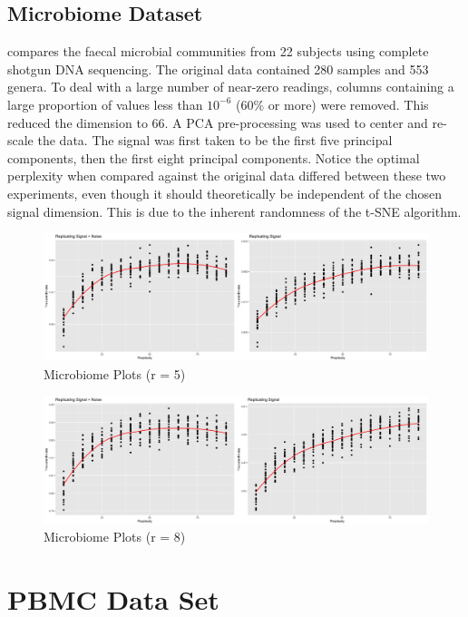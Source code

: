 \documentclass{article}
\begin{document}
\subsection{Microbiome Dataset}
\cite{enterotype data} compares the faecal microbial communities from 22 subjects using complete shotgun DNA sequencing. The original data contained 280 samples and 553 genera. To deal with a large number of near-zero readings, columns containing a large proportion of values less than $10^{-6}$ (60\% or more) were removed. This reduced the dimension to 66. A PCA pre-processing was used to center and re-scale the data. The signal was first taken to be the first five principal components, then the first eight principal components. Notice the optimal perplexity when compared against the original data differed between these two experiments, even though it should theoretically be independent of the chosen signal dimension. This is due to the inherent randomness of the t-SNE algorithm.

\begin{figure}[H]
\centering
\includegraphics[scale=0.205]{trust_plot_enterotype}
\caption{Microbiome Plots (r = 5)}
\end{figure}

\begin{figure}[H]
\centering
\includegraphics[scale=0.205]{trust_plot_enterotype2}
\caption{Microbiome Plots (r = 8)}
\end{figure}

\section{PBMC Data Set}
\end{document}
